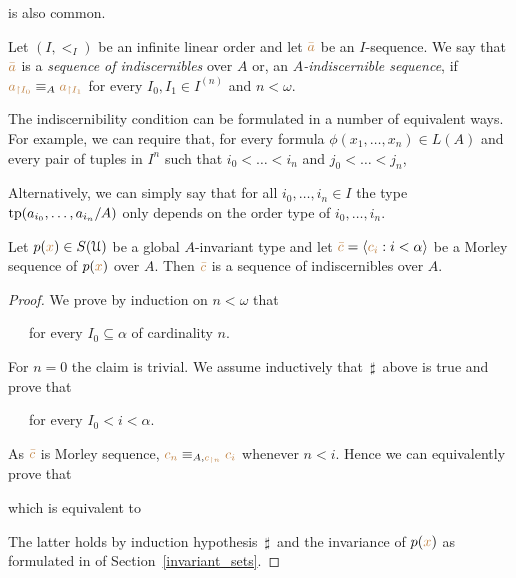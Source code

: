 \documentclass[creche.tex]{subfiles}
\begin{document}

is also common.
\begin{definition}
Let $(I,<_I)$ be an infinite linear order and let ${\color{brown}\bar a}$ be an $I$-sequence.
We say that ${\color{brown}\bar a}$ is a \emph{sequence of indiscernibles\/} over $A$ or, an \emph{$A$-indiscernible sequence\/}, if ${\color{brown} a_{\restriction I_0}}\equiv_A {\color{brown} a_{\restriction I_1}}$ for every $I_0,I_1\in I^{(n)}$ and $n<\omega$.
\QED
\end{definition}

The indiscernibility condition can be formulated in a number of equivalent ways.
For example, we can require that, for every formula $\phi(x_1,\dots,x_n)\in L(A)$ and every pair of tuples in $I^n$ such that $i_0<\dots<i_n$ and $j_0<\dots<j_n$,



Alternatively, we can simply say that for all $i_0,\dots,i_n\in I$ the type ${\rm tp}(a_{i_0},\dots,a_{i_n}/A)$ only depends on the order type of $i_0,\dots,i_n$.

\begin{proposition}
Let $p({\color{brown} x})\in S(\EuScript U)$ be a global $A$-invariant type and let ${\color{brown}\bar c}=\langle{\color{brown}c_i}:i<\alpha\rangle$ be a Morley sequence of $p({\color{brown} x})$ over $A$.
Then ${\color{brown}\bar c}$ is a sequence of indiscernibles over $A$.
\end{proposition}

\begin{proof}


We prove by induction on $n<\omega$ that

\ \ \ for every $I_0\subseteq\alpha$ of cardinality $n$.

For $n=0$ the claim is trivial. We assume inductively that $\,\sharp\,$ above is true and prove that

\ \ \ for every $I_0<i<\alpha$.

As ${\color{brown}\bar c}$ is  Morley sequence, ${\color{brown} c_n}\equiv_{A,{\color{brown} c_{\restriction n}}} {\color{brown} c_i}$ whenever $n<i$.
Hence we can equivalently prove that


which is equivalent to


The latter holds by induction hypothesis $\,\sharp\,$ and the invariance of $p({\color{brown} x})$ as formulated in  of Section~\ref{invariant_sets}.
\end{proof}
\end{document}
